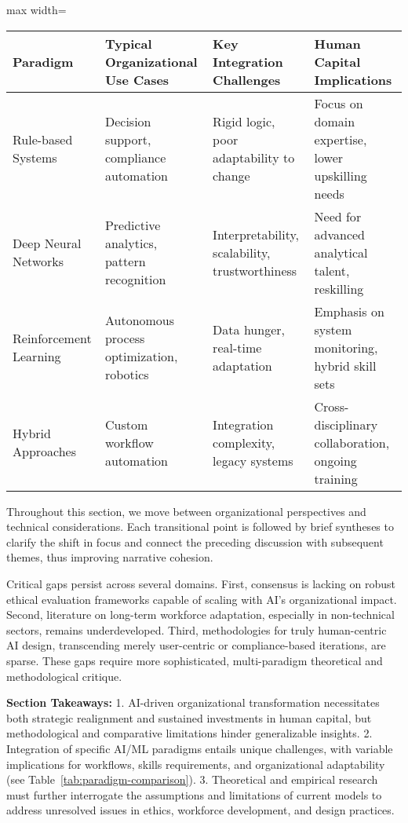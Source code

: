 \documentclass[sigconf]{acmart}
\begin{document}
\begin{table*}[htbp]
\centering
\caption{Comparison of AI/ML Paradigms and Organizational Integration Challenges}
\label{tab:paradigm-comparison}
\begin{adjustbox}{max width=\textwidth}
\begin{tabular}{@{}llll@{}}
\toprule
Paradigm & Typical Organizational Use Cases & Key Integration Challenges & Human Capital Implications \\ 
\midrule
Rule-based Systems & Decision support, compliance automation & Rigid logic, poor adaptability to change & Focus on domain expertise, lower upskilling needs \\ 
Deep Neural Networks & Predictive analytics, pattern recognition & Interpretability, scalability, trustworthiness & Need for advanced analytical talent, reskilling \\ 
Reinforcement Learning & Autonomous process optimization, robotics & Data hunger, real-time adaptation & Emphasis on system monitoring, hybrid skill sets \\ 
Hybrid Approaches & Custom workflow automation & Integration complexity, legacy systems & Cross-disciplinary collaboration, ongoing training \\ 
\bottomrule
\end{tabular}
\end{adjustbox}
\end{table*}

Throughout this section, we move between organizational perspectives and technical considerations. Each transitional point is followed by brief syntheses to clarify the shift in focus and connect the preceding discussion with subsequent themes, thus improving narrative cohesion.

Critical gaps persist across several domains. First, consensus is lacking on robust ethical evaluation frameworks capable of scaling with AI’s organizational impact. Second, literature on long-term workforce adaptation, especially in non-technical sectors, remains underdeveloped. Third, methodologies for truly human-centric AI design, transcending merely user-centric or compliance-based iterations, are sparse. These gaps require more sophisticated, multi-paradigm theoretical and methodological critique.

\textbf{Section Takeaways:}
1. AI-driven organizational transformation necessitates both strategic realignment and sustained investments in human capital, but methodological and comparative limitations hinder generalizable insights.
2. Integration of specific AI/ML paradigms entails unique challenges, with variable implications for workflows, skills requirements, and organizational adaptability (see Table~\ref{tab:paradigm-comparison}).
3. Theoretical and empirical research must further interrogate the assumptions and limitations of current models to address unresolved issues in ethics, workforce development, and design practices.
\end{document}
